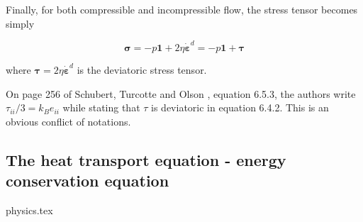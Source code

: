 Finally, for both compressible and incompressible flow, the stress tensor becomes simply
\begin{mdframed}[backgroundcolor=blue!5]
\begin{equation}
{\bm \sigma}=-p {\bm 1} + 2\eta \dot{\bm \varepsilon}^d = -p {\bm 1} + {\bm \tau}
\end{equation}
\end{mdframed}
where ${\bm \tau} = 2\eta \dot{\bm \varepsilon}^d$ is the deviatoric stress tensor.

\begin{remark}
On page 256 of Schubert, Turcotte and Olson \cite{scto01}, equation 6.5.3, the authors write $\tau_{ii}/3=k_B e_{ii}$ while stating that $\tau$ is deviatoric in equation 6.4.2. 
This is an obvious conflict of notations. 
\end{remark}

\subsection{The heat transport equation - energy conservation equation \label{ss:hte}}
\begin{flushright} {\tiny {\color{gray} physics.tex}} \end{flushright}

